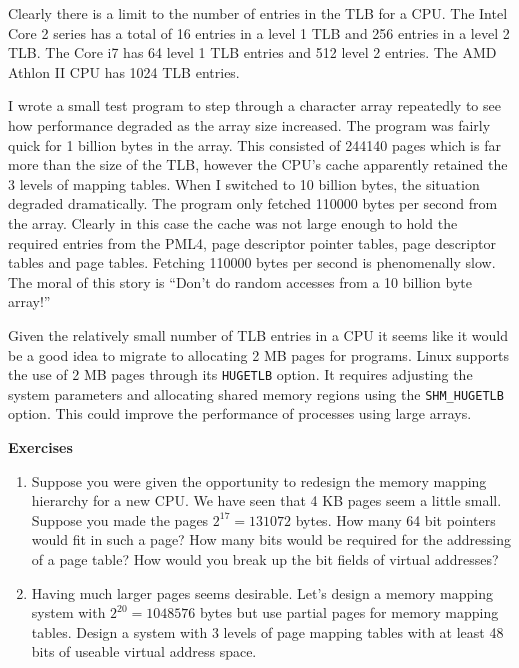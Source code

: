 \documentclass[11pt,b5paper]{book}
\begin{document}
Clearly there is a limit to the number of entries in the TLB for a CPU.
The Intel Core 2 series has a total of 16 entries in a level 1 TLB and 
256 entries in a level 2 TLB.
The Core i7 has 64 level 1 TLB entries and 512 level 2 entries.
The AMD Athlon II CPU has 1024 TLB entries.

I wrote a small test program to step through a character array repeatedly
to see how performance degraded as the array size increased.
The program was fairly quick for 1 billion bytes in the array.
This consisted of 244140 pages which is far more than the size of the TLB,
however the CPU's cache apparently retained the 3 levels of mapping tables.
When I switched to 10 billion bytes, the situation degraded dramatically.
The program only fetched 110000 bytes per second from the array.  Clearly
in this case the cache was not large enough to hold the required entries from the PML4, page
descriptor pointer tables, page descriptor tables and page tables.
Fetching 110000 bytes per second is phenomenally slow.
The moral of this story is ``Don't do random accesses from a 10 billion
byte array!''

Given the relatively small number of TLB entries in a CPU it seems like it would
be a good idea to migrate to allocating 2 MB pages for programs.
Linux supports the use of 2 MB pages through its {\tt HUGETLB} option.
It requires adjusting the system parameters and allocating shared memory regions
using the {\tt SHM\_HUGETLB} option.
This could improve the performance of processes using large arrays. 

\vfill
\break
{\bf\large Exercises}

\begin{enumerate}
    \item Suppose you were given the opportunity to redesign the memory mapping
    hierarchy for a new CPU.
    We have seen that 4 KB pages seem a little small.
    Suppose you made the pages $2^{17} = 131072$ bytes.
    How many 64 bit pointers would fit in such a page?
    How many bits would be required for the addressing of a page table?
    How would you break up the bit fields of virtual addresses?
    
    \item Having much larger pages seems desirable.
    Let's design a memory mapping system with $2^20=1048576$ bytes but use partial pages for memory mapping tables.
    Design a system with 3 levels of page mapping tables with at least 48 bits
    of useable virtual address space.
    
\end{enumerate}
\end{document}
